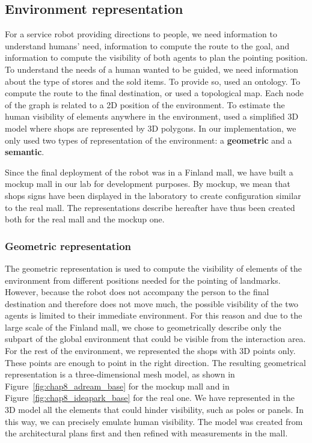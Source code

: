\newpage

\subsection{Environment representation}

For a service robot providing directions to people, we need information to understand humans' need, information to compute the route to the goal, and information to compute the visibility of both agents to plan the pointing position. To understand the needs of a human wanted to be guided, we need information about the type of stores and the sold items. To provide so, \cite{satake_2015_field, satake_2015_should} used an ontology. To compute the route to the final destination, \cite{matsumoto_2012_you} or \cite{okuno_2009_providing} used a topological map. Each node of the graph is related to a 2D position of the environment. To estimate the human visibility of elements anywhere in the environment, \cite{matsumoto_2012_you} used a simplified 3D model where shops are represented by 3D polygons. In our implementation, we only used two types of representation of the environment: a \textbf{geometric} and a \textbf{semantic}.

Since the final deployment of the robot was in a Finland mall, we have built a mockup mall in our lab for development purposes. By mockup, we mean that shops signs have been displayed in the laboratory to create configuration similar to the real mall. The representations describe hereafter have thus been created both for the real mall and the mockup one.

\subsubsection{Geometric representation}

The geometric representation is used to compute the visibility of elements of the environment from different positions needed for the pointing of landmarks. However, because the robot does not accompany the person to the final destination and therefore does not move much, the possible visibility of the two agents is limited to their immediate environment. For this reason and due to the large scale of the Finland mall, we chose to geometrically describe only the subpart of the global environment that could be visible from the interaction area. For the rest of the environment, we represented the shops with 3D points only. These points are enough to point in the right direction. The resulting geometrical representation is a three-dimensional mesh model, as shown in Figure~\ref{fig:chap8_adream_base} for the mockup mall and in Figure~\ref{fig:chap8_ideapark_base} for the real one. We have represented in the 3D model all the elements that could hinder visibility, such as poles or panels. In this way, we can precisely emulate human visibility. The model was created from the architectural plans first and then refined with measurements in the mall.

